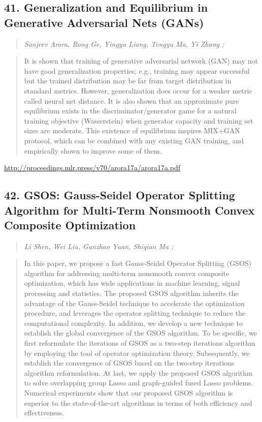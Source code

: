 \documentclass{article}
\begin{document}
\subsection{41. Generalization and Equilibrium in Generative Adversarial Nets (GANs)}

\begin{quote}
\footnotesize{\textit{Sanjeev Arora, Rong Ge, Yingyu Liang, Tengyu Ma, Yi Zhang ;}}
\end{quote}

\begin{quote}
    It is shown that training of generative adversarial network (GAN) may not have good generalization properties; e.g., training may appear successful but the trained distribution may be far from target distribution in standard metrics. However, generalization does occur for a weaker metric called neural net distance. It is also shown that an approximate pure equilibrium exists in the discriminator/generator game for a natural training objective (Wasserstein) when generator capacity and training set sizes are moderate. This existence of equilibrium inspires MIX+GAN protocol, which can be combined with any existing GAN training, and empirically shown to improve some of them.  \end{quote}

\href{http://proceedings.mlr.press/v70/arora17a/arora17a.pdf}{http://proceedings.mlr.press/v70/arora17a/arora17a.pdf}

\subsection{42. GSOS: Gauss-Seidel Operator Splitting Algorithm for Multi-Term Nonsmooth Convex Composite Optimization}

\begin{quote}
\footnotesize{\textit{Li Shen, Wei Liu, Ganzhao Yuan, Shiqian Ma ;}}
\end{quote}

\begin{quote}
    In this paper, we propose a fast Gauss-Seidel Operator Splitting (GSOS) algorithm for addressing multi-term nonsmooth convex composite optimization, which has wide applications in machine learning, signal processing and statistics. The proposed GSOS algorithm inherits the advantage of the Gauss-Seidel technique to accelerate the optimization procedure, and leverages the operator splitting technique to reduce the computational complexity. In addition, we develop a new technique to establish the global convergence of the GSOS algorithm. To be specific, we first reformulate the iterations of GSOS as a two-step iterations algorithm by employing the tool of operator optimization theory. Subsequently, we establish the convergence of GSOS based on the two-step iterations algorithm reformulation. At last, we apply the proposed GSOS algorithm to solve overlapping group Lasso and graph-guided fused Lasso problems. Numerical experiments show that our proposed GSOS algorithm is superior to the state-of-the-art algorithms in terms of both efficiency and effectiveness.  \end{quote}
\end{document}
